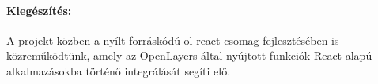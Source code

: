 \paragraph{Kiegészítés:}
A projekt közben a nyílt forráskódú ol-react csomag fejlesztésében is közreműködtünk, amely az OpenLayers által nyújtott funkciók React alapú alkalmazásokba történő integrálását segíti elő.
